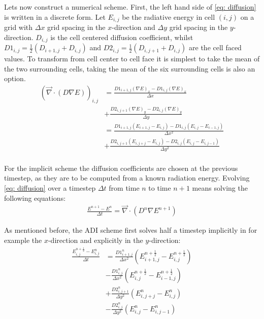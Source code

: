 Lets now construct a numerical scheme. First, the left hand side of \eqref{eq: diffusion} is written in a discrete form. Let $E_{i,j}$ be the radiative energy in cell $(i,j)$ on a grid with $\Delta x$ grid spacing in the $x$-direction and $\Delta y$ grid spacing in the $y$-direction. $D_{i,j}$ is the cell centered diffusion coefficient, whilst $D1_{i,j} = \frac{1}{2} (D_{i+1,j} + D_{i,j})$ and $D2_{i,j} = \frac{1}{2} (D_{i,j+1} + D_{i,j})$ are the cell faced values. To transform from cell center to cell face it is simplest to take the mean of the two surrounding cells, taking the mean of the six surrounding cells is also an option. 
\begin{align}
\left( \vec{\nabla} \cdot \left(D \nabla E\right) \right)_{i,j} 
 &= \frac{D1_{i+1,j} (\nabla E)_{x} - D1_{i,j} (\nabla E)_{x}}{\Delta x} \\
 &+ \frac{D2_{i,j+1} (\nabla E)_{y} - D2_{i,j} (\nabla E)_{y}}{\Delta y} \\ 
 &= \frac{D1_{i+1,j} (E_{i+1,j} - E_{i,j}) - D1_{i,j} (E_{i,j} - E_{i-1,j})}{\Delta x^2} \\
 &+ \frac{D2_{i,j+1} (E_{i,j+j} - E_{i,j}) - D2_{i,j} (E_{i,j} - E_{i,j-1})}{\Delta y^2} \\ 
\end{align}

For the implicit scheme the diffusion coefficients are chosen at the previous timestep, as they are to be computed from a known radiation energy. Evolving \eqref{eq: diffusion} over a timestep $\Delta t$ from time $n$ to time $n+1$ means solving the following equations:
\begin{align}
\frac{E^{n+1} - E^{n}}{\Delta t} = \vec{\nabla} \cdot \left(D^n \nabla E^{n+1}\right) \label{eq: Error_control}
\end{align}

As mentioned before, the ADI scheme first solves half a timestep implicitly in for example the $x$-direction and explicitly in the $y$-direction:
\begin{align}
\frac{E_{i,j}^{n+\frac{1}{2}} - E_{i,j}^{n}}{\Delta t}
 &= \frac{D1_{i+1,j}^{n}}{\Delta x^2} (E_{i+1,j}^{n+\frac{1}{2}} - E_{i,j}^{n+\frac{1}{2}}) \\
 &- \frac{D1_{i,j}^{n}}{\Delta x^2} (E_{i,j}^{n+\frac{1}{2}} - E_{i-1,j}^{n+\frac{1}{2}}) \\
 &+ \frac{D2_{i,j+1}^{n}}{\Delta y^2} (E_{i,j+j}^{n} - E_{i,j}^{n}) \\
 &- \frac{D2_{i,j}^{n}}{\Delta y^2} (E_{i,j}^{n} - E_{i,j-1}^{n})
\end{align}

